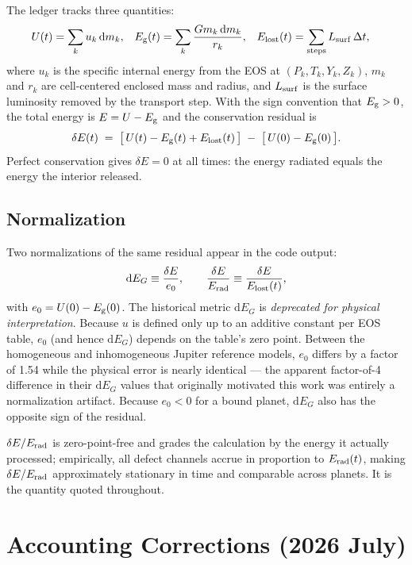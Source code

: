 \documentclass{aastex631}
\newcommand{\dd}{\mathrm{d}}
\newcommand{\Erad}{E_{\rm rad}}
\newcommand{\Eg}{E_{\rm g}}
\newcommand{\Elost}{E_{\rm lost}}
\newcommand{\dE}{\delta E}
\begin{document}
The ledger tracks three quantities:
\begin{align}
U(t)      &= \sum_k u_k\,\dd m_k, &
\Eg(t)    &= \sum_k \frac{G m_k\,\dd m_k}{r_k}, &
\Elost(t) &= \sum_{\rm steps} L_{\rm surf}\,\Delta t,
\end{align}
where $u_k$ is the specific internal energy from the EOS at $(P_k, T_k,
Y_k, Z_k)$, $m_k$ and $r_k$ are cell-centered enclosed mass and radius,
and $L_{\rm surf}$ is the surface luminosity removed by the transport
step.  With the sign convention that $\Eg>0$, the total energy is
$E = U - \Eg$ and the conservation residual is
\begin{equation}
\dE(t) \;=\; \bigl[\,U(t) - \Eg(t) + \Elost(t)\,\bigr] \;-\;
             \bigl[\,U(0) - \Eg(0)\,\bigr].
\label{eq:residual}
\end{equation}
Perfect conservation gives $\dE = 0$ at all times: the energy radiated
equals the energy the interior released.

\subsection{Normalization}
\label{sec:normalization}

Two normalizations of the same residual appear in the code output:
\begin{equation}
\mathrm{d}E_G \equiv \frac{\dE}{e_0}, \qquad
\frac{\dE}{\Erad} \equiv \frac{\dE}{\Elost(t)},
\end{equation}
with $e_0 = U(0)-\Eg(0)$.  The historical metric $\mathrm{d}E_G$ is
\emph{deprecated for physical interpretation}.  Because $u$ is defined
only up to an additive constant per EOS table, $e_0$ (and hence
$\mathrm{d}E_G$) depends on the table's zero point.  Between the
homogeneous and inhomogeneous Jupiter reference models, $e_0$ differs by a
factor of 1.54 while the physical error is nearly identical --- the
apparent factor-of-4 difference in their $\mathrm{d}E_G$ values that
originally motivated this work was entirely a normalization artifact.
Because
$e_0<0$ for a bound planet, $\mathrm{d}E_G$ also has the opposite sign of
the residual.

$\dE/\Erad$ is zero-point-free and grades the calculation by the energy it
actually processed; empirically, all defect channels accrue in proportion
to $\Erad(t)$, making $\dE/\Erad$ approximately stationary in time and
comparable across planets.  It is the quantity quoted throughout.

\section{Accounting Corrections (2026 July)}
\label{sec:fixes}
\end{document}
